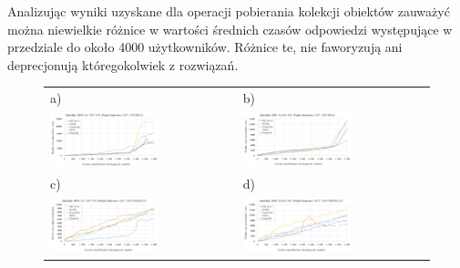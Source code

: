 Analizując wyniki uzyskane dla operacji pobierania kolekcji obiektów zauważyć można niewielkie różnice w wartości średnich czasów odpowiedzi występujące w przedziale do około 4000 użytkowników. Różnice te, nie faworyzują ani deprecjonują któregokolwiek z rozwiązań.

\begin{figure}[H]
  \advance\leftskip-1.7cm
  \begin{tabular}{@{}ll@{}}
    a) & b) \\
    \includegraphics[width=0.6\textwidth]{rys05/response-dotnet-fetchAllBills.pdf} & \includegraphics[width=0.6\textwidth]{rys05/response-nodejs-fetchAllBills.pdf} \\
    c) & d) \\
    \includegraphics[width=0.6\textwidth]{rys05/response-dotnet-getSingleOrder.pdf} & \includegraphics[width=0.6\textwidth]{rys05/response-nodejs-getSingleOrder.pdf} \\

\end{tabular}
\end{figure}
